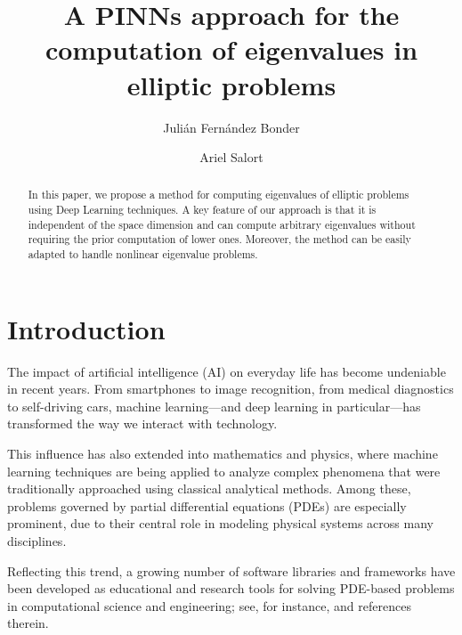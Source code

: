 \documentclass[reprint,superscriptaddress,aps,prl]{revtex4-2}
\begin{document}
\title{A PINNs approach for the computation of eigenvalues in elliptic problems}


\author{Juli\'an Fern\'andez Bonder}

\author{Ariel Salort}



\begin{abstract} 
In this paper, we propose a method for computing eigenvalues of elliptic problems using Deep Learning techniques. A key feature of our approach is that it is independent of the space dimension and can compute arbitrary eigenvalues without requiring the prior computation of lower ones. Moreover, the method can be easily adapted to handle nonlinear eigenvalue problems.
\end{abstract}

\maketitle

\section{Introduction}

The impact of artificial intelligence (AI) on everyday life has become undeniable in recent years. From smartphones to image recognition, from medical diagnostics to self-driving cars, machine learning—and deep learning in particular—has transformed the way we interact with technology.

This influence has also extended into mathematics and physics, where machine learning techniques are being applied to analyze complex phenomena that were traditionally approached using classical analytical methods. Among these, problems governed by partial differential equations (PDEs) are especially prominent, due to their central role in modeling physical systems across many disciplines.

Reflecting this trend, a growing number of software libraries and frameworks have been developed as educational and research tools for solving PDE-based problems in computational science and engineering; see, for instance, \cite{Lu-Meng-Mao, Rackauckas, Rackauckas-Innes-Ma-Bettencourt-etal} and references therein.
\end{document}
